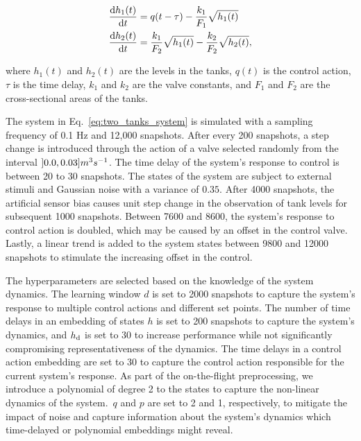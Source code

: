 \begin{equation}\label{eq:two_tanks_system}
	\begin{aligned}
		\diff{h_1(t)}{t} & = q(t-\tau) - \frac{k_1}{F_1}\sqrt{h_1(t)}                     \\
		\diff{h_2(t)}{t} & = \frac{k_1}{F_2}\sqrt{h_1(t)} - \frac{k_2}{F_2}\sqrt{h_2(t)},
	\end{aligned}
\end{equation}

where \(h_1(t)\) and \(h_2(t)\) are the levels in the tanks, \(q(t)\) is the control action, \(\tau \) is the time delay, \(k_1\) and \(k_2\) are the valve constants, and \(F_1\) and \(F_2\) are the cross-sectional areas of the tanks.

The system in Eq.~\ref{eq:two_tanks_system} is simulated with a sampling frequency of 0.1 Hz and 12,000 snapshots. After every 200 snapshots, a step change is introduced through the action of a valve selected randomly from the interval \(\interval[open left]{0.0}{0.03} m^3s^{-1}\). The time delay of the system's response to control is between 20 to 30 snapshots. The states of the system are subject to external stimuli and Gaussian noise with a variance of \(0.35\). After 4000 snapshots, the artificial sensor bias causes unit step change in the observation of tank levels for subsequent 1000 snapshots. Between 7600 and 8600, the system's response to control action is doubled, which may be caused by an offset in the control valve. Lastly, a linear trend is added to the system states between 9800 and 12000 snapshots to stimulate the increasing offset in the control.

The hyperparameters are selected based on the knowledge of the system dynamics. The learning window \(d\) is set to 2000 snapshots to capture the system's response to multiple control actions and different set points. The number of time delays in an embedding of states \(h\) is set to 200 snapshots to capture the system's dynamics, and \(h _{\text{d}}\) is set to 30 to increase performance while not significantly compromising representativeness of the dynamics. The time delays in a control action embedding are set to 30 to capture the control action responsible for the current system's response. As part of the on-the-flight preprocessing, we introduce a polynomial of degree 2 to the states to capture the non-linear dynamics of the system.~\(q\) and \(p\) are set to 2 and 1, respectively, to mitigate the impact of noise and capture information about the system's dynamics which time-delayed or polynomial embeddings might reveal.

